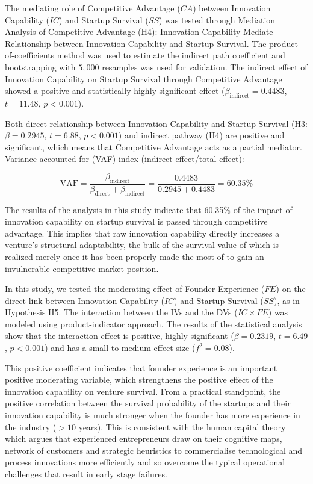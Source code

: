\documentclass{ieeeaccess}
\begin{document}
The mediating role of Competitive Advantage ($CA$) between Innovation Capability ($IC$) and Startup Survival ($SS$) was tested through Mediation Analysis of Competitive Advantage (H4): Innovation Capability Mediate Relationship between Innovation Capability and Startup Survival. The product-of-coefficients method was used to estimate the indirect path coefficient and bootstrapping with $5,000$ resamples was used for validation. The indirect effect of Innovation Capability on Startup Survival through Competitive Advantage showed a positive and statistically highly significant effect ($\beta_{\text{indirect}} = 0.4483$, $t = 11.48$, $p < 0.001$).

Both direct relationship between Innovation Capability and Startup Survival (H3: $\beta = 0.2945$, $t = 6.88$, $p < 0.001$) and indirect pathway (H4) are positive and significant, which means that Competitive Advantage acts as a partial mediator. Variance accounted for (VAF) index (indirect effect/total effect):

\begin{equation}
\text{VAF}
=
\frac{\beta_{\text{indirect}}}
{\beta_{\text{direct}} + \beta_{\text{indirect}}}
=
\frac{0.4483}
{0.2945 + 0.4483}
=
60.35\%
\end{equation}

The results of the analysis in this study indicate that 60.35\% of the impact of innovation capability on startup survival is passed through competitive advantage. This implies that raw innovation capability directly increases a venture's structural adaptability, the bulk of the survival value of which is realized merely once it has been properly made the most of to gain an invulnerable competitive market position.

In this study, we tested the moderating effect of Founder Experience ($FE$) on the direct link between Innovation Capability ($IC$) and Startup Survival ($SS$), as in Hypothesis H5. The interaction between the IVs and the DVs ($IC \times FE$) was modeled using product-indicator approach. The results of the statistical analysis show that the interaction effect is positive, highly significant ($\beta = 0.2319$, $t = 6.49$, $p < 0.001$) and has a small-to-medium effect size ($f^2 = 0.08$).

This positive coefficient indicates that founder experience is an important positive moderating variable, which strengthens the positive effect of the innovation capability on venture survival. From a practical standpoint, the positive correlation between the survival probability of the startups and their innovation capability is much stronger when the founder has more experience in the industry ($>10$ years). This is consistent with the human capital theory which argues that experienced entrepreneurs draw on their cognitive maps, network of customers and strategic heuristics to commercialise technological and process innovations more efficiently and so overcome the typical operational challenges that result in early stage failures.
\end{document}
